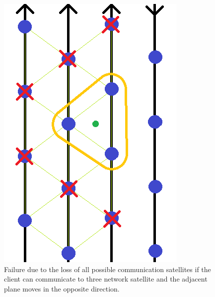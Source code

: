 \documentclass[12pt,a4paper]{report}
\begin{document}
\begin{figure}[H]
\begin{center}
\includegraphics[scale=0.5]{critical3C.PNG}
\caption[1 communication satellite failure counter-direction]{Failure due to the loss of all possible communication satellites if the client can communicate to three network satellite and the adjacent plane moves in the opposite direction.}
\label{fig:critical3C}
\end{center}
\end{figure}
\end{document}
